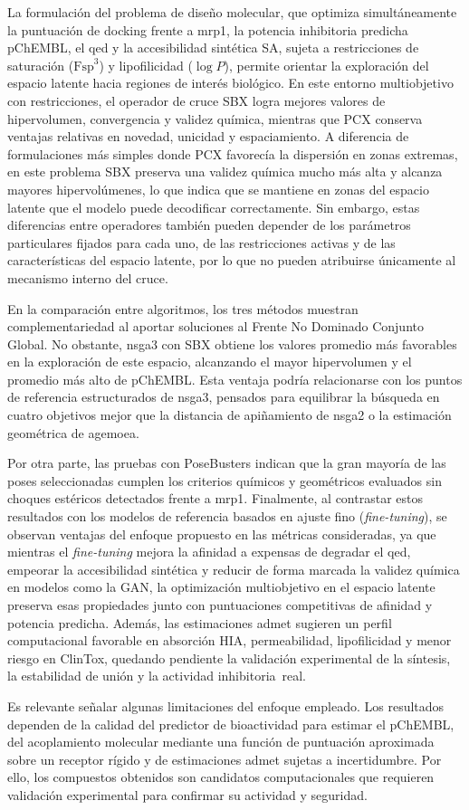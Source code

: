 La formulación del problema de diseño molecular, que optimiza simultáneamente la puntuación de docking frente a \gls{mrp1}, la potencia inhibitoria predicha pChEMBL, el \gls{qed} y la accesibilidad sintética SA, sujeta a restricciones de saturación ($\text{Fsp}^3$) y lipofilicidad ($\log P$), permite orientar la exploración del espacio latente hacia regiones de interés biológico. En este entorno multiobjetivo con restricciones, el operador de cruce SBX logra mejores valores de hipervolumen, convergencia y validez química, mientras que PCX conserva ventajas relativas en novedad, unicidad y espaciamiento. A diferencia de formulaciones más simples donde PCX favorecía la dispersión en zonas extremas, en este problema SBX preserva una validez química mucho más alta y alcanza mayores hipervolúmenes, lo que indica que se mantiene en zonas del espacio latente que el modelo puede decodificar correctamente. Sin embargo, estas diferencias entre operadores también pueden depender de los parámetros particulares fijados para cada uno, de las restricciones activas y de las características del espacio latente, por lo que no pueden atribuirse únicamente al mecanismo interno del cruce.

En la comparación entre algoritmos, los tres métodos muestran complementariedad al aportar soluciones al Frente No Dominado Conjunto Global. No obstante, \acrshort{nsga3} con SBX obtiene los valores promedio más favorables en la exploración de este espacio, alcanzando el mayor hipervolumen y el promedio más alto de pChEMBL. Esta ventaja podría relacionarse con los puntos de referencia estructurados de \acrshort{nsga3}, pensados para equilibrar la búsqueda en cuatro objetivos mejor que la distancia de apiñamiento de \acrshort{nsga2} o la estimación geométrica de \acrshort{agemoea}.

Por otra parte, las pruebas con PoseBusters indican que la gran mayoría de las poses seleccionadas cumplen los criterios químicos y geométricos evaluados sin choques estéricos detectados frente a \gls{mrp1}. Finalmente, al contrastar estos resultados con los modelos de referencia basados en ajuste fino (\textit{fine-tuning}), se observan ventajas del enfoque propuesto en las métricas consideradas, ya que mientras el \textit{fine-tuning} mejora la afinidad a expensas de degradar el \gls{qed}, empeorar la accesibilidad sintética y reducir de forma marcada la validez química en modelos como la GAN, la optimización multiobjetivo en el espacio latente preserva esas propiedades junto con puntuaciones competitivas de afinidad y potencia predicha. Además, las estimaciones \gls{admet} sugieren un perfil computacional favorable en absorción HIA, permeabilidad, lipofilicidad y menor riesgo en ClinTox, quedando pendiente la validación experimental de la síntesis, la estabilidad de unión y la actividad inhibitoria~real.

Es relevante señalar algunas limitaciones del enfoque empleado. Los resultados dependen de la calidad del predictor de bioactividad para estimar el pChEMBL, del acoplamiento molecular mediante una función de puntuación aproximada sobre un receptor rígido y de estimaciones \gls{admet} sujetas a incertidumbre. Por ello, los compuestos obtenidos son candidatos computacionales que requieren validación experimental para confirmar su actividad y seguridad.
